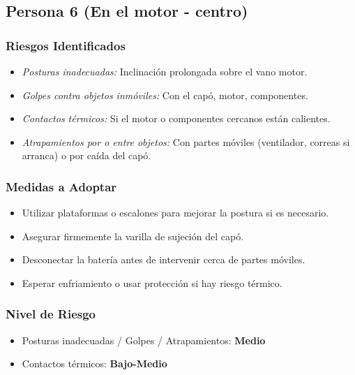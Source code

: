 \documentclass[12pt,a4paper]{article}
\begin{document}
	\bigskip\hrulefill\bigskip
	
	\subsection{Persona 6 (En el motor - centro)}
	
	\subsubsection{Riesgos Identificados}
	\begin{itemize}
		\item \textit{Posturas inadecuadas:} Inclinación prolongada sobre el vano motor.
		\item \textit{Golpes contra objetos inmóviles:} Con el capó, motor, componentes.
		\item \textit{Contactos térmicos:} Si el motor o componentes cercanos están calientes.
		\item \textit{Atrapamientos por o entre objetos:} Con partes móviles (ventilador, correas si arranca) o por caída del capó.
	\end{itemize}
	
	\subsubsection{Medidas a Adoptar}
	\begin{itemize}
		\item Utilizar plataformas o escalones para mejorar la postura si es necesario.
		\item Asegurar firmemente la varilla de sujeción del capó.
		\item Desconectar la batería antes de intervenir cerca de partes móviles.
		\item Esperar enfriamiento o usar protección si hay riesgo térmico.
	\end{itemize}
	
	\subsubsection{Nivel de Riesgo}
	\begin{itemize}
		\item Posturas inadecuadas / Golpes / Atrapamientos: \textbf{Medio}
		\item Contactos térmicos: \textbf{Bajo-Medio}
	\end{itemize}
	
	\bigskip\hrulefill\bigskip
	
\end{document}
